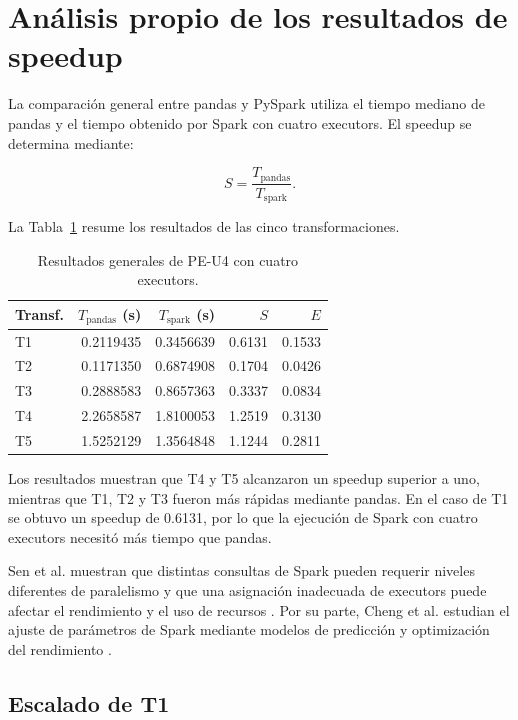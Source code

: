 \documentclass[12pt,a4paper]{article}
\begin{document}
\section{Análisis propio de los resultados de speedup}
\label{sec:speedup}

La comparación general entre pandas y PySpark utiliza el tiempo mediano de
pandas y el tiempo obtenido por Spark con cuatro executors. El speedup se
determina mediante:

\[
S=
\frac{T_{\text{pandas}}}
{T_{\text{spark}}}.
\]

La Tabla~\ref{tab:general} resume los resultados de las cinco transformaciones.

\begin{table}[H]
\centering
\caption{Resultados generales de PE-U4 con cuatro executors.}
\label{tab:general}
\begin{tabular}{lrrrr}
\toprule
\textbf{Transf.} &
\textbf{$T_{\text{pandas}}$ (s)} &
\textbf{$T_{\text{spark}}$ (s)} &
\textbf{$S$} &
\textbf{$E$} \\
\midrule
T1 & 0.2119435 & 0.3456639 & 0.6131 & 0.1533 \\
T2 & 0.1171350 & 0.6874908 & 0.1704 & 0.0426 \\
T3 & 0.2888583 & 0.8657363 & 0.3337 & 0.0834 \\
T4 & 2.2658587 & 1.8100053 & 1.2519 & 0.3130 \\
T5 & 1.5252129 & 1.3564848 & 1.1244 & 0.2811 \\
\bottomrule
\end{tabular}
\end{table}

Los resultados muestran que T4 y T5 alcanzaron un speedup superior a uno,
mientras que T1, T2 y T3 fueron más rápidas mediante pandas. En el caso de T1
se obtuvo un speedup de \num{0.6131}, por lo que la ejecución de Spark con
cuatro executors necesitó más tiempo que pandas.

Sen et al. muestran que distintas consultas de Spark pueden requerir niveles
diferentes de paralelismo y que una asignación inadecuada de executors puede
afectar el rendimiento y el uso de recursos \cite{sen2021}. Por su parte,
Cheng et al. estudian el ajuste de parámetros de Spark mediante modelos de
predicción y optimización del rendimiento \cite{cheng2021}.

\subsection{Escalado de T1}
\end{document}
